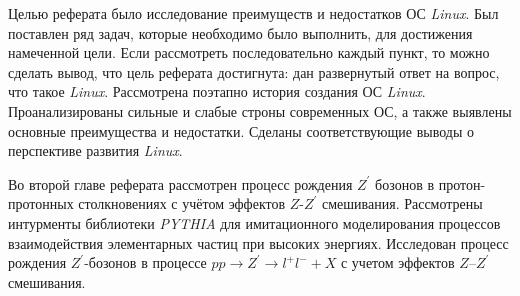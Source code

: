 Целью реферата было исследование преимуществ и недостатков ОС \textit{Linux}. Был поставлен ряд задач, которые необходимо было выполнить, для достижения намеченной цели. Если рассмотреть последовательно каждый пункт, то можно сделать вывод, что цель реферата достигнута: дан развернутый ответ на вопрос, что такое \textit{Linux}. Рассмотрена поэтапно история создания ОС \textit{Linux}. Проанализированы сильные и слабые строны современных ОС, а также выявлены основные преимущества и недостатки. Сделаны соответствующие выводы о перспективе развития \textit{Linux}.

Во второй главе реферата рассмотрен процесс рождения $Z^\prime$ бозонов в протон-протонных столкновениях с учётом эффектов $Z$-$Z^\prime$ смешивания. Рассмотрены интурменты библиотеки \textit{PYTHIA} для имитационного моделирования процессов взаимодействия элементарных частиц при высоких энергиях. Исследован процесс рождения $Z^\prime$-бозонов в процессе $pp \rightarrow Z^\prime \rightarrow l^+l^- + X$ с учетом эффектов $Z$--$Z^\prime$ смешивания.